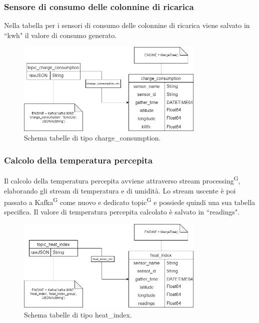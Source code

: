 \documentclass[8pt]{article}
\newcommand{\glossterm}[1]{#1\textsuperscript{G}} %
\begin{document}
\subsubsection{Sensore di consumo delle colonnine di ricarica}
Nella tabella per i sensori di consumo delle colonnine di ricarica viene salvato in ``kwh" il valore di consumo generato.
\begin{figure}[h!]
    \centering
    \includegraphics[width=0.8\textwidth]{images_st/tabelle_charge_consumption.png}
    \caption{Schema tabelle di tipo charge\_consumption.}
    \label{fig:Schema tabelle di tipo charge_consumption}
\end{figure}
\subsubsection{Calcolo della temperatura percepita}
Il calcolo della temperatura percepita avviene attraverso \glossterm{stream processing}, elaborando gli stream di temperatura e di umidità. Lo stream uscente è poi passato a \glossterm{Kafka} come nuovo e dedicato \glossterm{topic} e possiede quindi una sua tabella specifica. Il valore di temperatura percepita calcolato è salvato in ``readings".
\begin{figure}[h!]
    \centering
    \includegraphics[width=0.8\textwidth]{images_st/tabelle_heat_index.png}
    \caption{Schema tabelle di tipo heat\_index.}
    \label{fig:Schema tabelle di tipo heat_index}
\end{figure}
\clearpage
\end{document}
